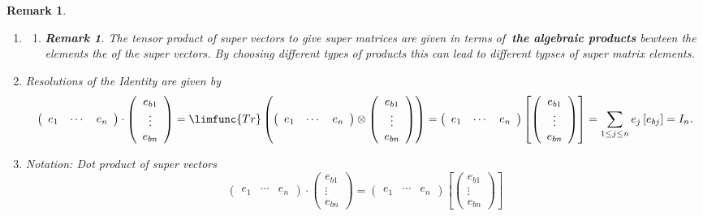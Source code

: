 \documentclass[aps,preprint]{revtex4}
\newtheorem{remark}[theorem]{Remark}
\begin{document}
\begin{remark}
\begin{enumerate}
\item 
\begin{enumerate}
\item 
\begin{remark}
The tensor product of super vectors to give super matrices are given in
terms of\textbf{\ the algebraic products} bewteen the elements the of the
super vectors. By choosing different types of products this can lead to
different typses of super matrix elements.
\end{remark}
\end{enumerate}

\item Resolutions of the Identity are given by 
\begin{equation}
\left( 
\begin{array}{ccc}
e_{1} & \cdots & e_{n}%
\end{array}%
\right) \cdot \left( 
\begin{array}{c}
e_{b1} \\ 
\vdots \\ 
e_{bn}%
\end{array}%
\right) =\limfunc{Tr}\left( \left( 
\begin{array}{ccc}
e_{1} & \cdots & e_{n}%
\end{array}%
\right) \otimes \left( 
\begin{array}{c}
e_{b1} \\ 
\vdots \\ 
e_{bn}%
\end{array}%
\right) \right) =\left( 
\begin{array}{ccc}
e_{1} & \cdots & e_{n}%
\end{array}%
\right) \left[ \left( 
\begin{array}{c}
e_{b1} \\ 
\vdots \\ 
e_{bn}%
\end{array}%
\right) \right] =\sum_{1\leq j\leq n}e_{j}\left[ e_{bj}\right] =I_{n}.
\end{equation}

\item Notation: Dot product of super vectors 
\begin{equation}
\left( 
\begin{array}{ccc}
e_{1} & \cdots & e_{n}%
\end{array}%
\right) \cdot \left( 
\begin{array}{c}
e_{b1} \\ 
\vdots \\ 
e_{bn}%
\end{array}%
\right) =\left( 
\begin{array}{ccc}
e_{1} & \cdots & e_{n}%
\end{array}%
\right) \left[ \left( 
\begin{array}{c}
e_{b1} \\ 
\vdots \\ 
e_{bn}%
\end{array}%
\right) \right]
\end{equation}


\end{enumerate}
\end{remark}
\end{document}
